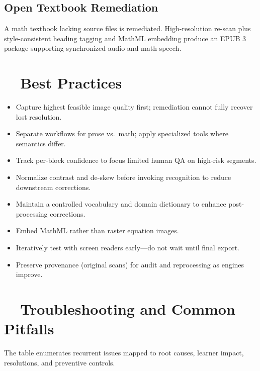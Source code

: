 \subsection{Open Textbook Remediation}
A math textbook lacking source files is remediated. High-resolution re-scan plus style-consistent heading tagging and MathML embedding produce an EPUB 3 package supporting synchronized audio and math speech.

\section{~~Best Practices}
\label{sec:ocr-best-practices}
\begin{itemize}
	\item Capture highest feasible image quality first; remediation cannot fully recover lost resolution.
	\item Separate workflows for prose vs.\ math; apply specialized tools where semantics differ.
	\item Track per-block confidence to focus limited human QA on high-risk segments.
	\item Normalize contrast and de-skew before invoking recognition to reduce downstream corrections.
	\item Maintain a controlled vocabulary and domain dictionary to enhance post-processing corrections.
	\item Embed MathML rather than raster equation images.
	\item Iteratively test with screen readers early—do not wait until final export.
	\item Preserve provenance (original scans) for audit and reprocessing as engines improve.
\end{itemize}

\section{~~Troubleshooting and Common Pitfalls}
\label{sec:ocr-troubleshooting}
The table enumerates recurrent issues mapped to root causes, learner impact, resolutions, and preventive controls.

